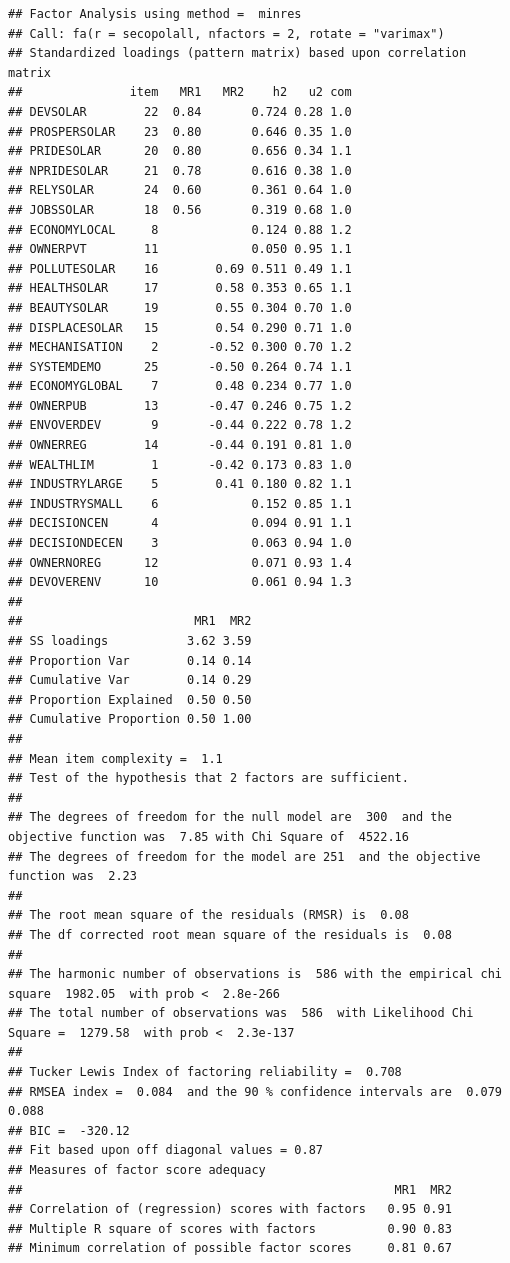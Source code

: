 \documentclass[
]{article}
\begin{document}
\begin{verbatim}
## Factor Analysis using method =  minres
## Call: fa(r = secopolall, nfactors = 2, rotate = "varimax")
## Standardized loadings (pattern matrix) based upon correlation matrix
##               item   MR1   MR2    h2   u2 com
## DEVSOLAR        22  0.84       0.724 0.28 1.0
## PROSPERSOLAR    23  0.80       0.646 0.35 1.0
## PRIDESOLAR      20  0.80       0.656 0.34 1.1
## NPRIDESOLAR     21  0.78       0.616 0.38 1.0
## RELYSOLAR       24  0.60       0.361 0.64 1.0
## JOBSSOLAR       18  0.56       0.319 0.68 1.0
## ECONOMYLOCAL     8             0.124 0.88 1.2
## OWNERPVT        11             0.050 0.95 1.1
## POLLUTESOLAR    16        0.69 0.511 0.49 1.1
## HEALTHSOLAR     17        0.58 0.353 0.65 1.1
## BEAUTYSOLAR     19        0.55 0.304 0.70 1.0
## DISPLACESOLAR   15        0.54 0.290 0.71 1.0
## MECHANISATION    2       -0.52 0.300 0.70 1.2
## SYSTEMDEMO      25       -0.50 0.264 0.74 1.1
## ECONOMYGLOBAL    7        0.48 0.234 0.77 1.0
## OWNERPUB        13       -0.47 0.246 0.75 1.2
## ENVOVERDEV       9       -0.44 0.222 0.78 1.2
## OWNERREG        14       -0.44 0.191 0.81 1.0
## WEALTHLIM        1       -0.42 0.173 0.83 1.0
## INDUSTRYLARGE    5        0.41 0.180 0.82 1.1
## INDUSTRYSMALL    6             0.152 0.85 1.1
## DECISIONCEN      4             0.094 0.91 1.1
## DECISIONDECEN    3             0.063 0.94 1.0
## OWNERNOREG      12             0.071 0.93 1.4
## DEVOVERENV      10             0.061 0.94 1.3
## 
##                        MR1  MR2
## SS loadings           3.62 3.59
## Proportion Var        0.14 0.14
## Cumulative Var        0.14 0.29
## Proportion Explained  0.50 0.50
## Cumulative Proportion 0.50 1.00
## 
## Mean item complexity =  1.1
## Test of the hypothesis that 2 factors are sufficient.
## 
## The degrees of freedom for the null model are  300  and the objective function was  7.85 with Chi Square of  4522.16
## The degrees of freedom for the model are 251  and the objective function was  2.23 
## 
## The root mean square of the residuals (RMSR) is  0.08 
## The df corrected root mean square of the residuals is  0.08 
## 
## The harmonic number of observations is  586 with the empirical chi square  1982.05  with prob <  2.8e-266 
## The total number of observations was  586  with Likelihood Chi Square =  1279.58  with prob <  2.3e-137 
## 
## Tucker Lewis Index of factoring reliability =  0.708
## RMSEA index =  0.084  and the 90 % confidence intervals are  0.079 0.088
## BIC =  -320.12
## Fit based upon off diagonal values = 0.87
## Measures of factor score adequacy             
##                                                    MR1  MR2
## Correlation of (regression) scores with factors   0.95 0.91
## Multiple R square of scores with factors          0.90 0.83
## Minimum correlation of possible factor scores     0.81 0.67
\end{verbatim}
\end{document}
